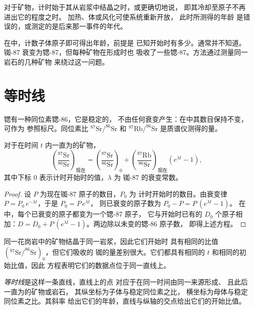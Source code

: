 对于矿物，计时始于其从岩浆中结晶之时，或更确切地说，
即其冷却至原子不再进出它的程度之时。
加热、体或风化可使系统重新开放，
此时所测得的年龄
是错误的，或测定的是后来那一事件的年代。

在中，计数子体原子即可得出年龄，前提是
已知开始时有多少。通常并不知道。铷-87
衰变为锶-87，但每种矿物在形成时也
吸收了一些锶-87。方法通过测量同一岩石的几种矿物
来绕过这一问题。

\section{等时线}

锶有一种同位素锶-86，它是稳定的，
不由任何衰变产生：在中其数目保持不变，可作为
参照标尺。同位素比 $^{87}\mathrm{Sr}/^{86}\mathrm{Sr}$ 和
$^{87}\mathrm{Rb}/^{86}\mathrm{Sr}$ 是质谱仪测得的量。

\begin{theorem}[等时线方程]\label{thm:g12:age-of-the-earth:isochron}
对于在时间 $t$ 内一直为的矿物，
\[
  \left(\frac{^{87}\mathrm{Sr}}{^{86}\mathrm{Sr}}\right)_{\text{现在}}
  = \left(\frac{^{87}\mathrm{Sr}}{^{86}\mathrm{Sr}}\right)_{0}
  + \left(\frac{^{87}\mathrm{Rb}}{^{86}\mathrm{Sr}}\right)_{\text{现在}}
  \left(e^{\lambda t} - 1\right),
\]
其中下标 0 表示计时开始时的值，$\lambda$ 为
铷-87 的衰变常数。
\end{theorem}

\begin{proof}
设 $P$ 为现在铷-87 原子的数目，$P_0$ 为
计时开始时的数目。由衰变律 $P = P_0\,e^{-\lambda t}$，于是 $P_0 = P\,e^{\lambda t}$，
则已衰变的原子数为 $P_0 - P = P\,(e^{\lambda t}-1)$。
在中，每个已衰变的原子都变为一个锶-87 原子，
它与开始时已有的 $D_0$ 个原子相加：$D = D_0 + P\,(e^{\lambda
t}-1)$。两边除以未变的锶-86 原子数，
即得上述方程。
\end{proof}

同一花岗岩中的矿物结晶于同一岩浆，因此它们开始时
具有相同的比值 $(^{87}\mathrm{Sr}/^{86}\mathrm{Sr})_0$，但它们吸收的
铷的量差别很大。它们都具有相同的 $t$ 和相同的初始比值，因此
方程表明它们的数据点位于同一直线上。

\begin{definition}[等时线]\label{def:g12:age-of-the-earth:isochron}
\emph{等时线}是这样一条直线，直线上的点
对应于在同一时间由同一来源形成、
且此后一直为的矿物或岩石，
其纵坐标为子体与稳定同位素之比，
横坐标为母体与稳定同位素之比。其斜率
给出它们的年龄，直线与纵轴的交点给出它们的开始比值。
\end{definition}

